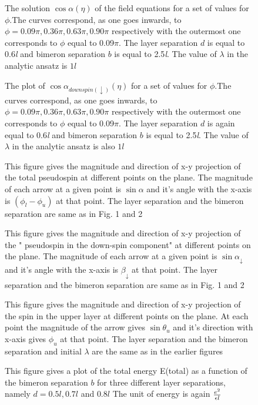 \begin{figure}
\label{fig1}
\caption{The solution  $\cos \alpha (\eta)$ of the field equations   
for a set of values for $\phi$.The curves correspond, as one  goes inwards, to
$\phi = 0.09\pi , 0.36\pi, 0.63\pi, 0.90\pi$  respectively with 
the outermost one corresponds to $\phi$ equal to 0.09$\pi$.
 The layer separation
 $d$ is equal to 0.6{\it l} and bimeron separation $b$ is equal to 
2.5{\it l}. The value of $\lambda$ in the analytic ansatz is $1l$ }
\end{figure}

\begin{figure}
\label{fig2}
\caption{The plot of  $\cos \alpha_{down spin(\downarrow)} (\eta)$   
for a set of values for $\phi$.The curves correspond, as one  goes inwards, to
$\phi = 0.09\pi , 0.36\pi, 0.63\pi, 0.90\pi$ respectively with 
the outermost one corresponds to $\phi$ equal to 0.09$\pi$. The 
layer separation
 $d$ is again equal to 0.6{\it l} and bimeron separation $b$ is equal to 
2.5{\it l}. The value of $\lambda$ in the analytic ansatz is also $1l$}
\end{figure}
\begin{figure}
\label{fig3}
\caption{This figure gives  the magnitude and direction 
of x-y projection of the total pseudospin 
  at different points on the plane. The magnitude of each arrow at a given 
point is 
$\sin \alpha$ and it's angle with the x-axis is $(\phi_{l} - \phi
_{u})$ at that point.
The layer separation and the  bimeron separation are same as in
Fig. 1 and 2}
\end{figure}
\begin{figure}
\label{fig4}
\caption{This figure gives  the magnitude and direction 
of x-y projection of the " pseudospin  in the down-spin component"
  at different points on the plane. The magnitude of each arrow at a given 
point is 
$\sin \alpha_{\downarrow}$ and it's angle with the x-axis is 
 $\beta_{\downarrow}$ at that point.
The layer separation and the  bimeron separation are same as in
Fig. 1 and 2}
\end{figure}
\begin{figure}
\label{fig5}
\caption{This figure gives  the magnitude and direction 
of x-y projection of the spin in the upper layer
  at different points on the plane.
At each point the magnitude of the arrow gives $\sin \theta_u$ and it's
direction with x-axis gives $\phi_u$ at that point.
The layer separation and the  bimeron separation  and initial
$\lambda$ are the same as in
the earlier figures}
\end{figure}
\begin{figure}
\label{fig6}
\caption{This figure gives  a plot of the total energy
E(total) as a function of the bimeron separation $b$
for three different layer separations, namely $d= 0.5l, 0.7l$ and $0.8l$
 The unit of energy is again $e^2 \over \epsilon l$}
\end{figure}

